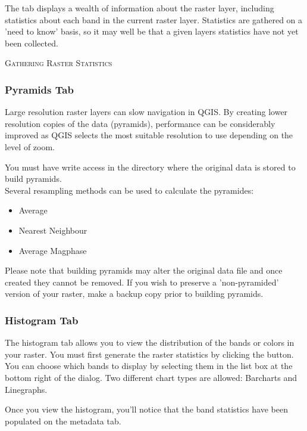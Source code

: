The  tab displays a wealth of information about the raster layer,
including statistics about each band in the current raster layer. Statistics
are gathered on a 'need to know' basis, so it may well be that a given layers
statistics have not yet been collected.


\begin{Tip}\caption{\textsc{Gathering Raster Statistics}}
\end{Tip}

\subsubsection{Pyramids Tab}\label{raster_pyramids}

Large resolution raster layers can slow navigation in QGIS. By creating lower
resolution copies of the data (pyramids), performance can be considerably
improved as QGIS selects the most suitable resolution to use depending on the
level of zoom.

You must have write access in the directory where the original data is stored
to build pyramids. \\
Several resampling methods can be used to calculate the pyramides:
\begin{itemize}
\item Average
\item Nearest Neighbour
\item Average Magphase
\end{itemize}

Please note that building pyramids may alter the original data file and once
created they cannot be removed. If you wish to preserve a 'non-pyramided'
version of your raster, make a backup copy prior to building pyramids.

\subsubsection{Histogram Tab}\label{raster_histogram}

The histogram tab allows you to view the distribution 
of the bands or colors in your raster. You must first generate the raster statistics 
by clicking the  button. You can choose which bands to display by 
selecting them in the list box at the bottom right of the dialog. Two different
chart types are allowed: Barcharts and Linegraphs.

Once you view the histogram, you'll notice that the band statistics have been
populated on the metadata tab.

